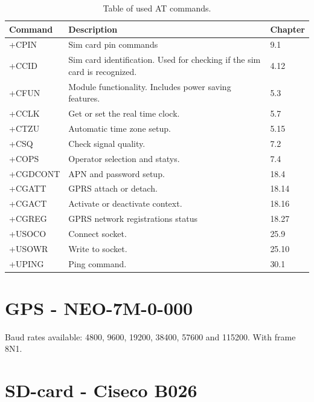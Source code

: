 \begin{table}[H]
	\begin{tabularx}{\textwidth}{l X X}
		\toprule
		Command & Description & Chapter \\
		\midrule
		+CPIN & Sim card pin commands & 9.1 \\
		+CCID & Sim card identification. Used for checking if the sim card is recognized. & 4.12 \\
		+CFUN & Module functionality. Includes power saving features. & 5.3 \\
		+CCLK & Get or set the real time clock. & 5.7 \\
		+CTZU & Automatic time zone setup. & 5.15 \\
		+CSQ & Check signal quality. & 7.2 \\
		+COPS & Operator selection and statys. & 7.4 \\
		+CGDCONT & APN and password setup. & 18.4 \\
		+CGATT & GPRS attach or detach. & 18.14 \\
		+CGACT & Activate or deactivate context. & 18.16 \\
		+CGREG & GPRS network registrations status & 18.27 \\
		+USOCO & Connect socket. & 25.9 \\
		+USOWR & Write to socket. & 25.10 \\
		+UPING & Ping command. & 30.1 \\
		\bottomrule
	\end{tabularx}
	\caption{Table of used AT commands.}
	\label{tab:ATcomm}
\end{table}

\section{GPS - NEO-7M-0-000}
Baud rates available: \num{4800}, \num{9600}, \num{19200}, \num{38400}, \num{57600} and \num{115200}. With frame 8N1.

\cite{MKRSchem}

\section{SD-card - Ciseco B026}

\FloatBarrier
